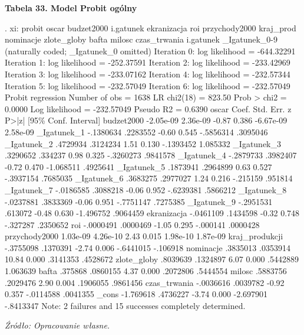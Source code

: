 \vspace{2cm}
\textbf{Tabela 33. Model Probit ogólny}
\begin{stlog}
. xi: probit oscar  budzet2000 i.gatunek ekranizacja roi przychody2000 kraj_prod nominacje zlote_globy bafta
 milosc czas_trwania
i.gatunek         _Igatunek_0-9       (naturally coded; _Igatunek_0 omitted)
{\smallskip}
Iteration 0:   log likelihood = -644.32291  
Iteration 1:   log likelihood = -252.37591  
Iteration 2:   log likelihood = -233.42969  
Iteration 3:   log likelihood = -233.07162  
Iteration 4:   log likelihood = -232.57344  
Iteration 5:   log likelihood = -232.57049  
Iteration 6:   log likelihood = -232.57049  
{\smallskip}
Probit regression                                 Number of obs   =       1638
                                                  LR chi2(18)     =     823.50
                                                  Prob > chi2     =     0.0000
Log likelihood = -232.57049                       Pseudo R2       =     0.6390
{\smallskip}
         oscar {\VBAR}      Coef.   Std. Err.      z    P>|z|     [95\% Conf. Interval]
    budzet2000 {\VBAR}  -2.05e-09   2.36e-09    -0.87   0.386    -6.67e-09    2.58e-09
   _Igatunek_1 {\VBAR}  -.1380634   .2283552    -0.60   0.545    -.5856314    .3095046
   _Igatunek_2 {\VBAR}   .4729934   .3124234     1.51   0.130    -.1393452    1.085332
   _Igatunek_3 {\VBAR}   .3290652    .334237     0.98   0.325    -.3260273    .9841578
   _Igatunek_4 {\VBAR}  -.2879733   .3982407    -0.72   0.470    -1.068511    .4925641
   _Igatunek_5 {\VBAR}   .1873941   .2964899     0.63   0.527    -.3937154    .7685035
   _Igatunek_6 {\VBAR}   .3683275   .2977027     1.24   0.216     -.215159     .951814
   _Igatunek_7 {\VBAR}  -.0186585   .3088218    -0.06   0.952    -.6239381    .5866212
   _Igatunek_8 {\VBAR}  -.0237881   .3833369    -0.06   0.951    -.7751147    .7275385
   _Igatunek_9 {\VBAR}  -.2951531    .613072    -0.48   0.630    -1.496752    .9064459
   ekranizacja {\VBAR}  -.0461109   .1434598    -0.32   0.748     -.327287    .2350652
           roi {\VBAR}  -.0000491   .0000469    -1.05   0.295     -.000141    .0000428
 przychody2000 {\VBAR}   1.03e-09   4.26e-10     2.43   0.015     1.98e-10    1.87e-09
kraj_produkcji {\VBAR}  -.3755098   .1370391    -2.74   0.006    -.6441015    -.106918
     nominacje {\VBAR}   .3835013   .0353914    10.84   0.000     .3141353    .4528672
   zlote_globy {\VBAR}   .8039639   .1324897     6.07   0.000     .5442889    1.063639
         bafta {\VBAR}    .375868   .0860155     4.37   0.000     .2072806    .5444554
        milosc {\VBAR}   .5883756   .2029476     2.90   0.004     .1906055    .9861456
  czas_trwania {\VBAR}  -.0036616   .0039782    -0.92   0.357    -.0114588    .0041355
         _cons {\VBAR}  -1.769618   .4736227    -3.74   0.000    -2.697901   -.8413347
Note: 2 failures and 15 successes completely determined.
\end{stlog}
\textit{\footnotesize{Źródło: Opracowanie własne.}} \\

